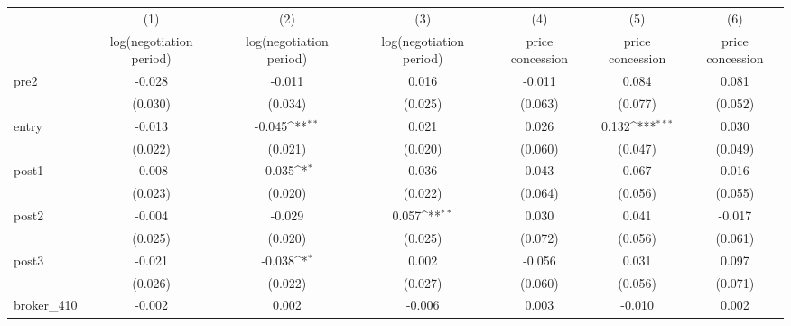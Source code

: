 {
\def\sym#1{\ifmmode^{#1}\else\(^{#1}\)\fi}
\begin{tabular}{l*{6}{c}}
\toprule
            &\multicolumn{1}{c}{(1)}&\multicolumn{1}{c}{(2)}&\multicolumn{1}{c}{(3)}&\multicolumn{1}{c}{(4)}&\multicolumn{1}{c}{(5)}&\multicolumn{1}{c}{(6)}\\
            &\multicolumn{1}{c}{log(negotiation period)}&\multicolumn{1}{c}{log(negotiation period)}&\multicolumn{1}{c}{log(negotiation period)}&\multicolumn{1}{c}{price concession}&\multicolumn{1}{c}{price concession}&\multicolumn{1}{c}{price concession}\\
\midrule
pre2        &      -0.028         &      -0.011         &       0.016         &      -0.011         &       0.084         &       0.081         \\
            &     (0.030)         &     (0.034)         &     (0.025)         &     (0.063)         &     (0.077)         &     (0.052)         \\
\addlinespace
entry       &      -0.013         &      -0.045\sym{**} &       0.021         &       0.026         &       0.132\sym{***}&       0.030         \\
            &     (0.022)         &     (0.021)         &     (0.020)         &     (0.060)         &     (0.047)         &     (0.049)         \\
\addlinespace
post1       &      -0.008         &      -0.035\sym{*}  &       0.036         &       0.043         &       0.067         &       0.016         \\
            &     (0.023)         &     (0.020)         &     (0.022)         &     (0.064)         &     (0.056)         &     (0.055)         \\
\addlinespace
post2       &      -0.004         &      -0.029         &       0.057\sym{**} &       0.030         &       0.041         &      -0.017         \\
            &     (0.025)         &     (0.020)         &     (0.025)         &     (0.072)         &     (0.056)         &     (0.061)         \\
\addlinespace
post3       &      -0.021         &      -0.038\sym{*}  &       0.002         &      -0.056         &       0.031         &       0.097         \\
            &     (0.026)         &     (0.022)         &     (0.027)         &     (0.060)         &     (0.056)         &     (0.071)         \\
\addlinespace
broker\_410  &      -0.002         &       0.002         &      -0.006         &       0.003         &      -0.010         &       0.002         \\

\end{tabular}}

